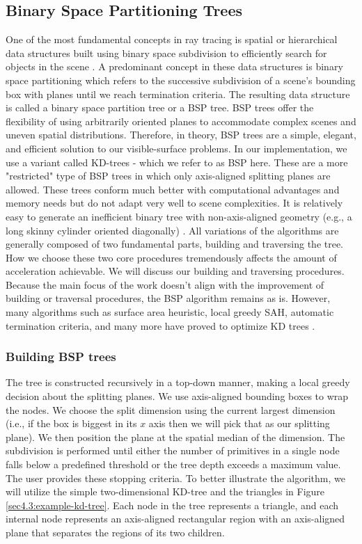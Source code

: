 \documentclass[a4paper,11pt,oneside]{article}
\begin{document}
\subsection{Binary Space Partitioning Trees}
\label{section:bsp-optimization}

One of the most fundamental concepts in ray tracing is spatial or hierarchical data structures built using binary space subdivision to efficiently search for objects in the scene \cite{ray_tracing_BSP2}. A predominant concept in these data structures is binary space partitioning which refers to the successive subdivision of a scene's bounding box with planes until we reach termination criteria. The resulting data structure is called a binary space partition tree or a BSP tree. BSP trees offer the flexibility of using arbitrarily oriented planes to accommodate complex scenes and uneven spatial distributions. Therefore, in theory, BSP trees are a simple, elegant, and efficient solution to our visible-surface problems. In our implementation, we use a variant called KD-trees - which we refer to as BSP here. These are a more "restricted" type of BSP trees in which only axis-aligned splitting planes are allowed. These trees conform much better with computational advantages and memory needs but do not adapt very well to scene complexities. It is relatively easy to generate an inefficient binary tree with non-axis-aligned geometry (e.g., a long skinny cylinder oriented diagonally) \cite{ray_tracing_BSP}. All variations of the algorithms are generally composed of two fundamental parts, building and traversing the tree. How we choose these two core procedures tremendously affects the amount of acceleration achievable. We will discuss our building and traversing procedures. Because the main focus of the work doesn't align with the improvement of building or traversal procedures, the BSP algorithm remains as is. However, many algorithms such as surface area heuristic, local greedy SAH, automatic termination criteria, and many more have proved to optimize KD trees \cite{fast_building_kd_trees, parallel_kd_tree_construction}.

\subsubsection{Building BSP trees}

The tree is constructed recursively in a top-down manner, making a local greedy decision about the splitting planes. We use axis-aligned bounding boxes to wrap the nodes. We choose the split dimension using the current largest dimension (i.e., if the box is biggest in its $x$ axis then we will pick that as our splitting plane). We then position the plane at the spatial median of the dimension. The subdivision is performed until either the number of primitives in a single node falls below a predefined threshold or the tree depth exceeds a maximum value.  The user provides these stopping criteria. To better illustrate the algorithm, we will utilize the simple two-dimensional KD-tree and the triangles in Figure \ref{sec4.3:example-kd-tree}. Each node in the tree represents a triangle, and each internal node represents an axis-aligned rectangular region with an axis-aligned plane that separates the regions of its two children.
\end{document}

